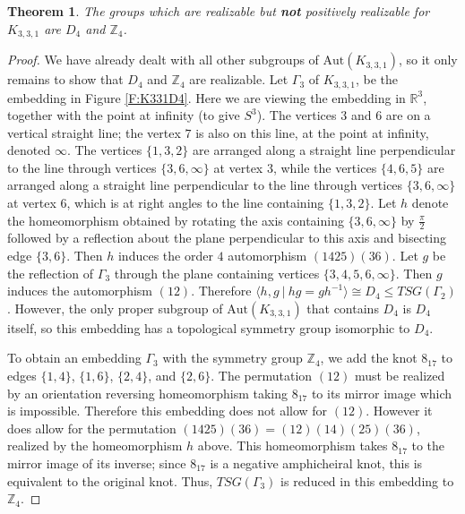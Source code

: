 \documentclass[11]{amsart}
\def\Z{\mathbb{Z}}
\def\Aut{{\mathrm{Aut}}}
\newtheorem{theorem}{Theorem}[section]
\theoremstyle{definition}
\theoremstyle{remark}
\begin{document}
\begin{theorem} \label{T:K331TSG}
The groups which are realizable but {\bf not} positively realizable for $K_{3,3,1}$ are $D_4$ and $\Z_4$.
\end{theorem}

\begin{proof}
We have already dealt with all other subgroups of $\Aut(K_{3,3,1})$, so it only remains to show that $D_4$ and $\Z_4$ are realizable.  Let $\Gamma_3$ of $K_{3,3,1}$, be the embedding in Figure \ref{F:K331D4}.  Here we are viewing the embedding in $\mathbb{R}^3$, together with the point at infinity (to give $S^3$). The vertices $3$ and $6$ are on a vertical straight line; the vertex $7$ is also on this line, at the point at infinity, denoted $\infty$.  The vertices $\{1, 3, 2\}$ are arranged along a straight line perpendicular to the line through vertices $\{3,6,\infty\}$ at vertex $3$, while the vertices $\{4, 6, 5\}$ are arranged along a straight line perpendicular to the line through vertices $\{3,6,\infty\}$ at vertex $6$, which is at right angles to the line containing $\{1, 3, 2\}$.  Let $h$ denote the homeomorphism obtained by rotating the axis containing $\{3,6,\infty\}$ by $\frac{\pi}{2}$ followed by a reflection about the plane perpendicular to this axis and bisecting edge $\{3,6\}$. Then $h$ induces the order $4$ automorphism $(1425)(36)$.  Let $g$ be the reflection of $\Gamma_3$ through the plane containing vertices $\{3,4,5,6, \infty\}$.  Then $g$ induces the automorphism $(12)$.  Therefore $\langle h,g \ | \ hg=gh^{-1} \rangle \cong D_4 \leq TSG(\Gamma_2)$.  However, the only proper subgroup of $\Aut(K_{3,3,1})$ that contains $D_4$ is $D_4$ itself, so this embedding has a topological symmetry group isomorphic to $D_4$.

To obtain an embedding $\Gamma_3$ with the symmetry group $\Z_4$, we add  the knot $8_{17}$ to edges $\{1,4\}$, $\{1,6\}$, $\{2,4\}$, and $\{2,6\}$.  The permutation $(12)$ must be realized by an orientation reversing homeomorphism taking $8_{17}$ to its mirror image which is impossible.  Therefore this embedding does not allow for $(12)$.  However it does allow for the permutation $(1425)(36)=(12)(14)(25)(36)$, realized by the homeomorphism $h$ above. This homeomorphism takes $8_{17}$ to the mirror image of its inverse; since $8_{17}$ is a negative amphicheiral knot, this is equivalent to the original knot.   Thus, $TSG(\Gamma_3)$ is reduced in this embedding to $\Z_4$.  
\end{proof}
\end{document}
